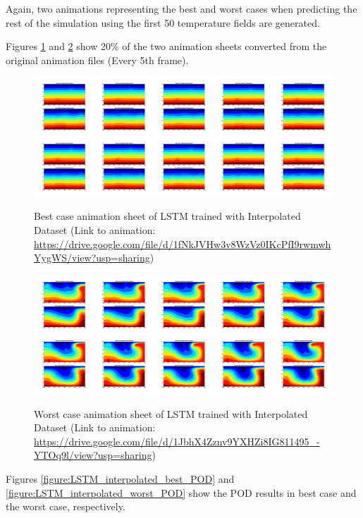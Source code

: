 Again, two animations representing the best and worst cases when predicting the rest of the simulation using the first 50 temperature fields are generated.

Figures \ref{figure:LSTM_interpolated_best_gif} and \ref{figure:LSTM_interpolated_worst_gif} show 20\% of the two animation sheets converted from the original animation files (Every 5th frame).

\begin{figure}[H]
    \centering
    \caption{Best case animation sheet of LSTM trained with Interpolated Dataset (Link to animation: \url{https://drive.google.com/file/d/1fNkJVHw3v8WzVz0IKcPfI9rwmwhYygWS/view?usp=sharing})}
    \includegraphics[scale=0.10]{figures/mantle_convection_images/larger_dataset_interpolated/LSTM_Best_GIF_sheet.png}
     \label{figure:LSTM_interpolated_best_gif}
\end{figure}

\begin{figure}[H]
    \centering
    \caption{Worst case animation sheet of LSTM trained with Interpolated Dataset (Link to animation: 
    \url{https://drive.google.com/file/d/1JbhX4Zznv9YXHZi8IG811495_-YTOq9l/view?usp=sharing})}
    \includegraphics[scale=0.10]{figures/mantle_convection_images/larger_dataset_interpolated/LSTM_Worst_GIF_sheet.png}
    \label{figure:LSTM_interpolated_worst_gif}
\end{figure}

Figures \ref{figure:LSTM_interpolated_best_POD} and \ref{figure:LSTM_interpolated_worst_POD} show the POD results in best case and the worst case, respectively.

